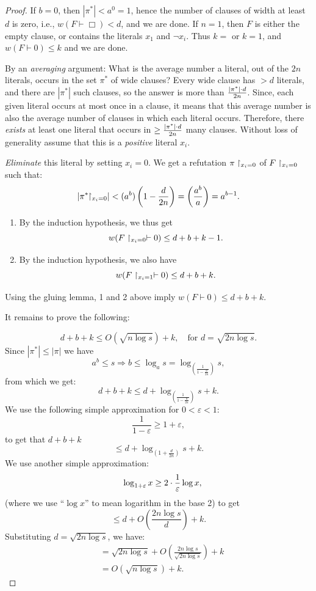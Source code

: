 \begin{proof}
\Base  If $b = 0$, then $|\pi^*| < a^0 = 1$, hence the number of clauses of width at least $d$ is zero, i.e., $w(F\vdash\Box)<d$, and we are done.
 If $n = 1$, then $F$ is either the empty clause, or contains the literals $x_1$ and $\neg x_i$. Thus $k=$ or $k=1$, and  $w(F \vdash 0) \le k$ and we are done.

\induction By an \textit{averaging} argument:  What is the average number a literal, out of the $2n$ literals, occurs in the set $\pi^*$ of wide clauses? Every wide clause has $> d$ literals, and there are $|\pi^*|$ such clauses, so the answer is more than  $\frac{|\pi^*|\cdot d}{2n}$. Since, each given literal occurs at most once in a clause, it means that this average number is also the average number of clauses in which each literal occurs. Therefore, there \emph{exists} at least one literal that occurs in $\ge \frac{|\pi^*|\cdot d}{2n}$ many clauses. 
Without loss of generality assume that this is a \emph{positive} literal $x_i$.
    
\textit{Eliminate} this literal by setting $x_i = 0$. We get a refutation $\pi\upharpoonright_{x_i = 0}$ of $F\upharpoonright_{x_i = 0}$ such that:
    \[
    \left|\pi^*\!\!\upharpoonright_{x_i = 0}\right| < (a^b) \left( 1 - \frac{d}{2n} \right) = \left( \frac{a^b}{a} \right) = a^{b-1}.
    \]

    \begin{enumerate}
        \item By the induction hypothesis, we thus get
        \[
        w(F\upharpoonright_{x_i = 0} \vdash 0) \leq d + b + k - 1.
        \]
        \item By the induction hypothesis, we also have
        \[
        w(F\upharpoonright_{x_i = 1} \vdash 0) \leq d + b + k.
        \]
    \end{enumerate}

    Using the gluing lemma, 1 and 2 above imply 
    $w(F \vdash 0) \leq d + b + k$.


\bigskip 
It remains to prove the following:


    \[
    d + b + k \leq O\left(\sqrt{n \log s}\right) + k, \quad \text{for } d = \sqrt{2n \log s}.
    \]
Since $|\pi^*|\le|\pi|$ we have
    \[
    a^b \le s \Rightarrow b \le \log_{a} s = 
    \log_{
        \left(
            \frac{1}{1-\frac{d}{2n}}
        \right)
      }s,
    \]
    from which we get:
    \[
    d + b + k \le d + \log_{\left(\frac{1}{1 - \frac{d}{2n}}\right)}s + k.
    \]
    We use the following simple approximation for $0<\varepsilon<1$:
    \[
    \frac{1}{1 - \varepsilon} \ge  1 + \varepsilon,
    \]
    to get that $d+b+k$
    \[
    \leq d + \log_{\left(1 + \frac{d}{2n} \right)} s + k.
    \]
We use another simple approximation:
\[
 \quad \log_{1+\varepsilon} x \ge 2\cdot \frac{1}{\varepsilon} \log x,
    \]
(where we use ``$\log x$'' to mean logarithm in the base 2) to get
    \[
    \leq d + O\left(\frac{2n \log s}{d} \right) + k.
    \]
    Substituting $d = \sqrt{2n \log s}$, we have:
    \begin{align*}
    &= \sqrt{2n \log s} + O \left(\frac{2n \log s}{\sqrt{2n \log s}}\right) + k\\
       & = O\left(\sqrt{n \log s} \right) + k.
    \end{align*}
       \mbox{}
\end{proof}

